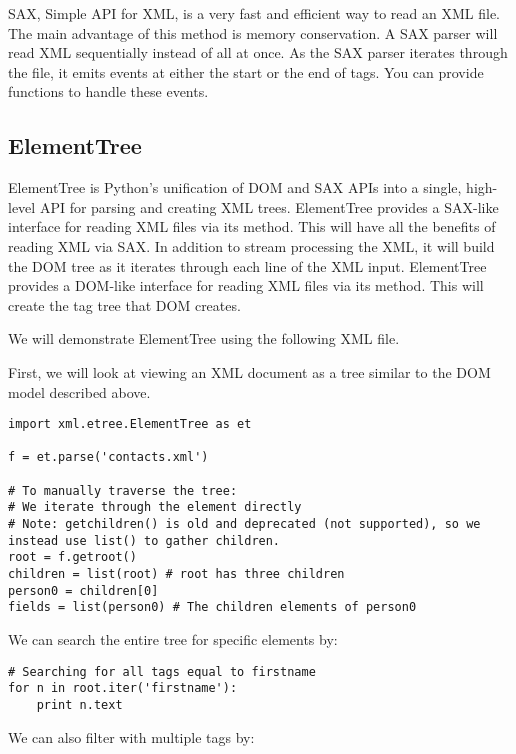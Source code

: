 SAX, Simple API for XML, is a very fast and efficient way to read an XML file.
The main advantage of this method is memory conservation.
A SAX parser will read XML sequentially instead of all at once.
As the SAX parser iterates through the file, it emits events at either the start or the end of tags.
You can provide functions to handle these events.

\subsection*{ElementTree} %

ElementTree is Python's unification of DOM and SAX APIs into a single, high-level API for parsing and creating XML trees.
ElementTree provides a SAX-like interface for reading XML files via its  method.
This will have all the benefits of reading XML via SAX.
In addition to stream processing the XML, it will build the DOM tree as it iterates through each line of the XML input.
ElementTree provides a DOM-like interface for reading XML files via its  method.
This will create the tag tree that DOM creates.

We will demonstrate ElementTree using the following XML file.


First, we will look at viewing an XML document as a tree similar to the DOM model described above.

\begin{lstlisting}
import xml.etree.ElementTree as et

f = et.parse('contacts.xml')

# To manually traverse the tree:
# We iterate through the element directly
# Note: getchildren() is old and deprecated (not supported), so we instead use list() to gather children.
root = f.getroot()
children = list(root) # root has three children
person0 = children[0]
fields = list(person0) # The children elements of person0
\end{lstlisting}

We can search the entire tree for specific elements by:

\begin{lstlisting}
# Searching for all tags equal to firstname
for n in root.iter('firstname'):
    print n.text
\end{lstlisting}

We can also filter with multiple tags by:

